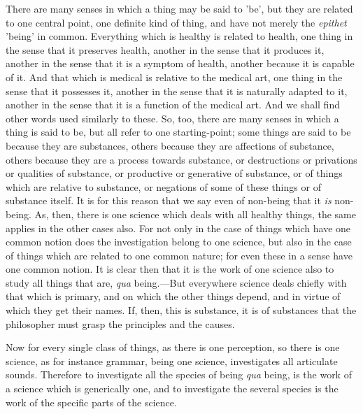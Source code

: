 There are many senses in which a thing may be said to 'be', but they are related to one central point, one definite kind of thing, and have not merely the \emph{epithet} 'being' in common. Everything which is healthy is related to health, one thing in the sense that it preserves health, another in the sense that it produces it, another in the sense that it is a symptom of health, another because it is capable of it. And that which is medical is relative to the medical art, one thing in the sense that it possesses it, another in the sense that it is naturally adapted to it, another in the sense that it is a function of the medical art. And we shall find other words used similarly to these. So, too, there are many senses in which a thing is said to be, but all refer to one starting-point; some things are said to be because they are substances, others because they are affections of substance, others because they are a process towards substance, or destructions or privations or qualities of substance, or productive or generative of substance, or of things which are relative to substance, or negations of some of these things or of substance itself. It is for this reason that we say even of non-being that it \emph{is} non-being. As, then, there is one science which deals with all healthy things, the same applies in the other cases also. For not only in the case of things which have one common notion does the investigation belong to one science, but also in the case of things which are related to one common nature; for even these in a sense have one common notion. It is clear then that it is the work of one science also to study all things that are, \emph{qua} being.—But everywhere science deals chiefly with that which is primary, and on which the other things depend, and in virtue of which they get their names. If, then, this is substance, it is of substances that the philosopher must grasp the principles and the causes.

Now for every single class of things, as there is one perception, so there is one science, as for instance grammar, being one science, investigates all articulate sounds. Therefore to investigate all the species of being \emph{qua} being, is the work of a science which is generically one, and to investigate the several species is the work of the specific parts of the science.

